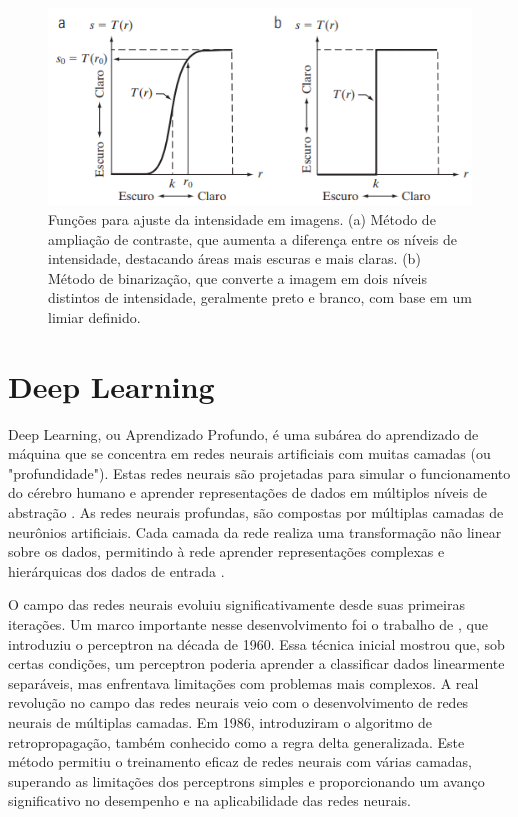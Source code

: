 \begin{figure}
    \centering   
    \includegraphics[width=\textwidth]{fig/ExemploTranformacaoIntensidade.png}
    \caption{Funções para ajuste da intensidade em imagens. (a) Método de ampliação de contraste, que aumenta a diferença entre os níveis de intensidade, destacando áreas mais escuras e mais claras. (b) Método de binarização, que converte a imagem em dois níveis distintos de intensidade, geralmente preto e branco, com base em um limiar definido.}
    \label{exemploTransformacaoIntensidade}
\end{figure}


\section{Deep Learning}

Deep Learning, ou Aprendizado Profundo, é uma subárea do aprendizado de máquina que se concentra em redes neurais artificiais com muitas camadas (ou "profundidade"). Estas redes neurais são projetadas para simular o funcionamento do cérebro humano e aprender representações de dados em múltiplos níveis de abstração \cite{goodfellow2016deep}.
As redes neurais profundas, são compostas por múltiplas camadas de neurônios artificiais. Cada camada da rede realiza uma transformação não linear sobre os dados, permitindo à rede aprender representações complexas e hierárquicas dos dados de entrada \cite{haykin2001redes}.

O campo das redes neurais evoluiu significativamente desde suas primeiras iterações. Um marco importante nesse desenvolvimento foi o trabalho de , que introduziu o perceptron na década de 1960. Essa técnica inicial mostrou que, sob certas condições, um perceptron poderia aprender a classificar dados linearmente separáveis, mas enfrentava limitações com problemas mais complexos.
A real revolução no campo das redes neurais veio com o desenvolvimento de redes neurais de múltiplas camadas. Em 1986,  introduziram o algoritmo de retropropagação, também conhecido como a regra delta generalizada. Este método permitiu o treinamento eficaz de redes neurais com várias camadas, superando as limitações dos perceptrons simples e proporcionando um avanço significativo no desempenho e na aplicabilidade das redes neurais.


